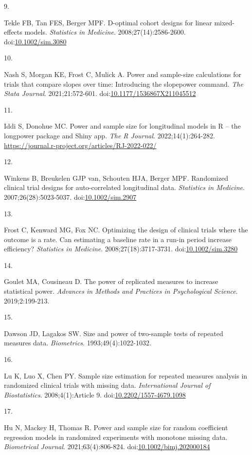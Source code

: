 \documentclass[
  11pt,
]{article}
\newlength{\cslhangindent}
\newlength{\csllabelwidth}
\newenvironment{CSLReferences}[2] %
 {\begin{list}{}{%
  \setlength{\itemindent}{0pt}
  \setlength{\leftmargin}{0pt}
  \setlength{\parsep}{0pt}
  \ifodd #1
   \setlength{\leftmargin}{\cslhangindent}
   \setlength{\itemindent}{-1\cslhangindent}
  \fi
  \setlength{\itemsep}{#2\baselineskip}}}
 {\end{list}}
\newcommand{\CSLLeftMargin}[1]{\parbox[t]{\csllabelwidth}{\strut#1\strut}}
\newcommand{\CSLRightInline}[1]{\parbox[t]{\linewidth - \csllabelwidth}{\strut#1\strut}}
\begin{document}
\begin{CSLReferences}{0}{1}
\CSLLeftMargin{9. }%
\CSLRightInline{Tekle FB, Tan FES, Berger MPF. D-optimal cohort designs for linear mixed-effects models. \emph{Statistics in Medicine}. 2008;27(14):2586-2600. doi:\href{https://doi.org/10.1002/sim.3080}{10.1002/sim.3080}}

\CSLLeftMargin{10. }%
\CSLRightInline{Nash S, Morgan KE, Frost C, Mulick A. Power and sample-size calculations for trials that compare slopes over time: Introducing the slopepower command. \emph{The Stata Journal}. 2021;21:572-601. doi:\href{https://doi.org/10.1177/1536867X211045512}{10.1177/1536867X211045512}}

\CSLLeftMargin{11. }%
\CSLRightInline{Iddi S, Donohue MC. Power and sample size for longitudinal models in {R} -- the longpower package and {Shiny} app. \emph{The R Journal}. 2022;14(1):264-282. \url{https://journal.r-project.org/articles/RJ-2022-022/}}

\CSLLeftMargin{12. }%
\CSLRightInline{Winkens B, Breukelen GJP van, Schouten HJA, Berger MPF. Randomized clinical trial designs for auto-correlated longitudinal data. \emph{Statistics in Medicine}. 2007;26(28):5023-5037. doi:\href{https://doi.org/10.1002/sim.2907}{10.1002/sim.2907}}

\CSLLeftMargin{13. }%
\CSLRightInline{Frost C, Kenward MG, Fox NC. Optimizing the design of clinical trials where the outcome is a rate. {Can} estimating a baseline rate in a run-in period increase efficiency? \emph{Statistics in Medicine}. 2008;27(18):3717-3731. doi:\href{https://doi.org/10.1002/sim.3280}{10.1002/sim.3280}}

\CSLLeftMargin{14. }%
\CSLRightInline{Goulet MA, Cousineau D. The power of replicated measures to increase statistical power. \emph{Advances in Methods and Practices in Psychological Science}. 2019;2:199-213.}

\CSLLeftMargin{15. }%
\CSLRightInline{Dawson JD, Lagakos SW. Size and power of two-sample tests of repeated measures data. \emph{Biometrics}. 1993;49(4):1022-1032.}

\CSLLeftMargin{16. }%
\CSLRightInline{Lu K, Luo X, Chen PY. Sample size estimation for repeated measures analysis in randomized clinical trials with missing data. \emph{International Journal of Biostatistics}. 2008;4(1):Article 9. doi:\href{https://doi.org/10.2202/1557-4679.1098}{10.2202/1557-4679.1098}}

\CSLLeftMargin{17. }%
\CSLRightInline{Hu N, Mackey H, Thomas R. Power and sample size for random coefficient regression models in randomized experiments with monotone missing data. \emph{Biometrical Journal}. 2021;63(4):806-824. doi:\href{https://doi.org/10.1002/bimj.202000184}{10.1002/bimj.202000184}}

\end{CSLReferences}
\end{document}
